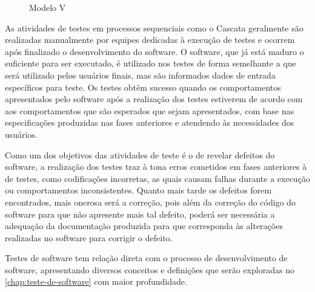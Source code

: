     \begin{figure}[!htb]
	    \centering
	    \begin{minipage}{\wd0}
		    \caption{Modelo V}
		    \label{fig:modelo-v}
	    \end{minipage}
    \end{figure}
   
    As atividades de testes em processos sequenciais como o Cascata geralmente são realizadas manualmente por equipes dedicadas à execução de testes e ocorrem após finalizado o desenvolvimento do software. O software, que já está maduro o suficiente para ser executado, é utilizado nos testes de forma semelhante a que será utilizado pelos usuários finais, mas são informados dados de entrada específicos para teste. Os testes obtêm sucesso quando os comportamentos apresentados pelo software após a realização dos testes estiverem de acordo com aos comportamentos que são esperados que sejam apresentados, com base nas especificações produzidas nas fases anteriores e atendendo às necessidades dos usuários. 
    
    Como um dos objetivos das atividades de teste é o de revelar defeitos do software, a realização dos testes traz à tona erros cometidos em fases anteriores à de testes, como codificações incorretas, as quais causam falhas durante a execução ou comportamentos inconsistentes. Quanto mais tarde os defeitos forem encontrados, mais onerosa será a correção, pois além da correção do código do software para que não apresente mais tal defeito, poderá ser necessária a adequação da documentação produzida para que corresponda às alterações realizadas no software para corrigir o defeito.
    
    Testes de software tem relação direta com o processo de desenvolvimento de software, apresentando diversos conceitos e definições que serão exploradas no \autoref{chap:teste-de-software} com maior profundidade.
    
